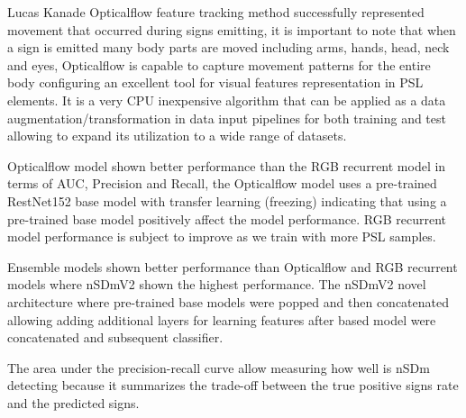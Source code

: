 \documentclass[twocolumn,conference]{article}
\begin{document}
Lucas Kanade Opticalflow feature tracking method successfully represented movement that occurred during signs emitting, it is important to note that when a sign is emitted many body parts are moved including arms, hands, head, neck and eyes, Opticalflow is capable to capture movement patterns for the entire body configuring an excellent tool for visual features representation in PSL elements. It is a very CPU inexpensive algorithm that can be applied as a data augmentation/transformation in data input pipelines for both training and test allowing to expand its utilization to a wide range of datasets.

Opticalflow model shown better performance than the RGB recurrent model in terms of AUC, Precision and Recall, the Opticalflow model uses a pre-trained RestNet152 base model with transfer learning (freezing) indicating that using a pre-trained base model positively affect the model performance. RGB recurrent model performance is subject to improve as we train with more PSL samples. 

Ensemble models shown better performance than Opticalflow and RGB recurrent models where nSDmV2 shown the highest performance. The nSDmV2 novel architecture where pre-trained base models were popped and then concatenated allowing adding additional layers for learning features after based model were concatenated and subsequent classifier. 

The area under the precision-recall curve allow measuring how well is nSDm detecting because it summarizes the trade-off between the true positive signs rate and the predicted signs.



\end{document}
